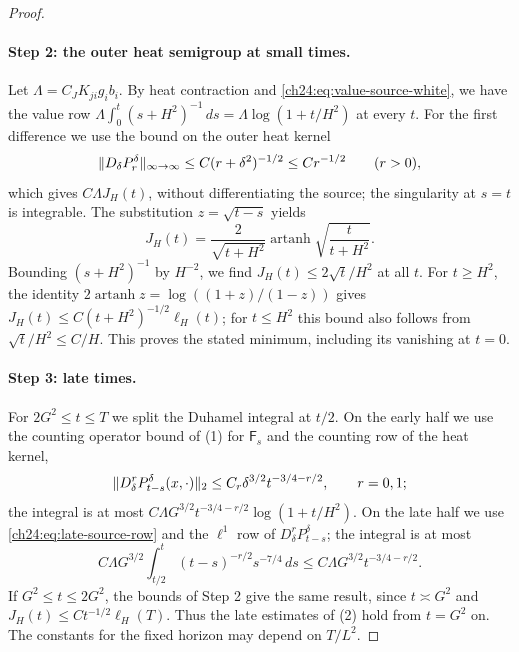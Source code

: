 \begin{proof}
\paragraph{Step 2: the outer heat semigroup at small times.}
Let $\Lambda=C_JK_{ji}g_ib_i$. By heat contraction and \eqref{ch24:eq:value-source-white}, we have the value row $\Lambda\int_0^t(s+H^2)^{-1}\,ds=\Lambda\log(1+t/H^2)$ at every $t$. For the first difference we use the bound on the outer heat kernel
\[
 \lVert D_\delta P_r^\delta\rVert_{\infty\to\infty}\le C(r+\delta^2)^{-1/2}\le Cr^{-1/2}\qquad(r>0),
\]
which gives $C\Lambda J_H(t)$, without differentiating the source; the singularity at $s=t$ is integrable. The substitution $z=\sqrt{t-s}$ yields
\begin{equation}\label{ch24:eq:J-formula}
 J_H(t)=\frac{2}{\sqrt{t+H^2}}\operatorname{artanh}\sqrt{\frac{t}{t+H^2}}.
\end{equation}
Bounding $(s+H^2)^{-1}$ by $H^{-2}$, we find $J_H(t)\le2\sqrt t/H^2$ at all $t$. For $t\ge H^2$, the identity $2\operatorname{artanh}z=\log((1+z)/(1-z))$ gives $J_H(t)\le C(t+H^2)^{-1/2}\ell_H(t)$; for $t\le H^2$ this bound also follows from $\sqrt t/H^2\le C/H$. This proves the stated minimum, including its vanishing at $t=0$.

\paragraph{Step 3: late times.}
For $2G^2\le t\le T$ we split the Duhamel integral at $t/2$. On the early half we use the counting operator bound of (1) for $\mathsf F_s$ and the counting row of the heat kernel,
\[
 \lVert D_\delta^rP_{t-s}^\delta(x,\cdot)\rVert_2\le C_r\delta^{3/2}t^{-3/4-r/2},\qquad r=0,1;
\]
the integral is at most $C\Lambda G^{3/2}t^{-3/4-r/2}\log(1+t/H^2)$. On the late half we use \eqref{ch24:eq:late-source-row} and the $\ell^1$ row of $D_\delta^rP_{t-s}^\delta$; the integral is at most
\[
 C\Lambda G^{3/2}\int_{t/2}^t(t-s)^{-r/2}s^{-7/4}\,ds\le C\Lambda G^{3/2}t^{-3/4-r/2}.
\]
If $G^2\le t\le2G^2$, the bounds of Step 2 give the same result, since $t\asymp G^2$ and $J_H(t)\le Ct^{-1/2}\ell_H(T)$. Thus the late estimates of (2) hold from $t=G^2$ on. The constants for the fixed horizon may depend on $T/L^2$.


\end{proof}
